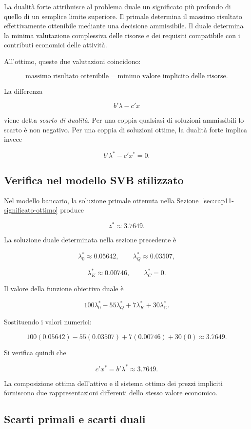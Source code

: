 La dualit\`a forte attribuisce al problema duale un significato pi\`u profondo
di quello di un semplice limite superiore. Il primale determina il massimo
risultato effettivamente ottenibile mediante una decisione ammissibile. Il
duale determina la minima valutazione complessiva delle risorse e dei
requisiti compatibile con i contributi economici delle attivit\`a.

All'ottimo, queste due valutazioni coincidono:

\[
\text{massimo risultato ottenibile}
=
\text{minimo valore implicito delle risorse}.
\]

La differenza

\[
b'\lambda-c'x
\]

\noindent viene detta \emph{scarto di dualit\`a}. Per una coppia qualsiasi di soluzioni
ammissibili lo scarto \`e non negativo. Per una coppia di soluzioni ottime,
la dualit\`a forte implica invece

\[
b'\lambda^*-c'x^*=0.
\]

\subsection{Verifica nel modello SVB stilizzato}

Nel modello bancario, la soluzione primale ottenuta nella
Sezione~\ref{sec:cap11-significato-ottimo} produce

\[
z^*
\approx
3.7649.
\]

La soluzione duale determinata nella sezione precedente \`e

\[
\lambda_0^*
\approx
0.05642,
\qquad
\lambda_Q^*
\approx
0.03507,
\]

\[
\lambda_K^*
\approx
0.00746,
\qquad
\lambda_C^*
=
0.
\]

Il valore della funzione obiettivo duale \`e

\[
100\lambda_0^*
-
55\lambda_Q^*
+
7\lambda_K^*
+
30\lambda_C^*.
\]

Sostituendo i valori numerici:

\[
100(0.05642)
-
55(0.03507)
+
7(0.00746)
+
30(0)
\approx
3.7649.
\]

Si verifica quindi che

\[
c'x^*
=
b'\lambda^*
\approx
3.7649.
\]

La composizione ottima dell'attivo e il sistema ottimo dei prezzi impliciti
forniscono due rappresentazioni differenti dello stesso valore economico.

\subsection{Scarti primali e scarti duali}

